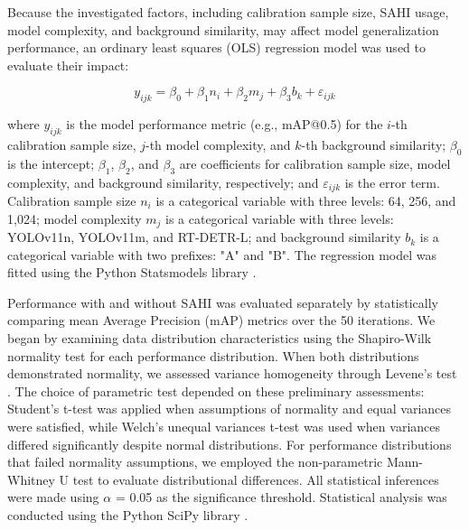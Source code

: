 Because the investigated factors, including calibration sample size, SAHI usage, model complexity, and background similarity, may affect model generalization performance, an ordinary least squares (OLS) regression model was used to evaluate their impact:

\begin{equation}
y_{ijk} = \beta_0 + \beta_1 n_i + \beta_2 m_j + \beta_3 b_k + \varepsilon_{ijk}
\label{eq4}
\end{equation}

where $y_{ijk}$ is the model performance metric (e.g., mAP@0.5) for the $i$-th calibration sample size, $j$-th model complexity, and $k$-th background similarity; $\beta_0$ is the intercept; $\beta_1$, $\beta_2$, and $\beta_3$ are coefficients for calibration sample size, model complexity, and background similarity, respectively; and $\varepsilon_{ijk}$ is the error term. Calibration sample size $n_i$ is a categorical variable with three levels: 64, 256, and 1,024; model complexity $m_j$ is a categorical variable with three levels: YOLOv11n, YOLOv11m, and RT-DETR-L; and background similarity $b_k$ is a categorical variable with two prefixes: "A" and "B". The regression model was fitted using the Python Statsmodels library \cite{seabold_statsmodels_2010}.

Performance with and without SAHI was evaluated separately by statistically comparing mean Average Precision (mAP) metrics over the 50 iterations. We began by examining data distribution characteristics using the Shapiro-Wilk normality test \cite{shapiro_analysis_1965} for each performance distribution. When both distributions demonstrated normality, we assessed variance homogeneity through Levene's test \cite{levene_robust_1960}. The choice of parametric test depended on these preliminary assessments: Student's t-test was applied when assumptions of normality and equal variances were satisfied, while Welch's unequal variances t-test \cite{welch_generalization_1947} was used when variances differed significantly despite normal distributions. For performance distributions that failed normality assumptions, we employed the non-parametric Mann-Whitney U test \cite{mann_test_1947} to evaluate distributional differences. All statistical inferences were made using $\alpha$ = 0.05 as the significance threshold. Statistical analysis was conducted using the Python SciPy library \cite{virtanen_scipy_2020}.
